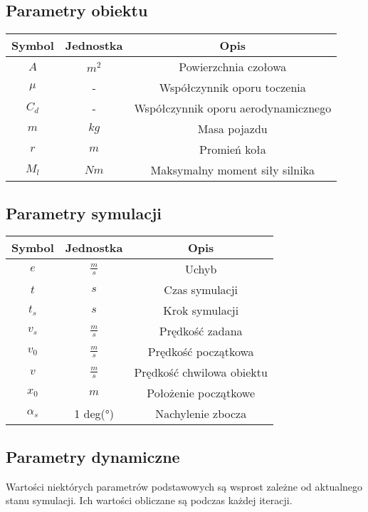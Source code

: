 \documentclass[12pt,a4paper]{article}
\begin{document}
	\subsection{Parametry obiektu}
	\begin{center}
		\begin{tabular}{|c|c|c|}
			\hline
			Symbol & Jednostka & Opis \\
			\hline
			\hline
			$A$ & $m^2$ & Powierzchnia czołowa \\
			\hline
			$\mu$ & - & Współczynnik oporu toczenia \\
			\hline
			$C_d$ & - & Współczynnik oporu aerodynamicznego \\
			\hline
			$m$ & $kg$ & Masa pojazdu \\
			\hline
			$r$ & $m$ & Promień koła \\
			\hline
			$M_l$ & $Nm$ & Maksymalny moment siły silnika \\
			\hline
		\end{tabular}
	\end{center}

	\subsection{Parametry symulacji}
	\begin{center}
		\begin{tabular}{|c|c|c|}
			\hline
			Symbol & Jednostka & Opis \\
			\hline
			\hline
			$e$ & $\frac{m}{s}$ & Uchyb \\
			\hline
			$t$ & $s$ & Czas symulacji \\
			\hline
			$t_s$ & $s$ & Krok symulacji \\
			\hline
			$v_s$ & $\frac{m}{s}$ & Prędkość zadana \\
			\hline
			$v_0$ & $\frac{m}{s}$ & Prędkość początkowa \\
			\hline
			$v$ & $\frac{m}{s}$ & Prędkość chwilowa obiektu \\
			\hline
			$x_0$ & $m$ & Położenie początkowe \\
			\hline
			$\alpha_s$ & 1 deg(°) & Nachylenie zbocza \\
			\hline
		\end{tabular}
	\end{center}
	
	\subsection{Parametry dynamiczne}
	Wartości niektórych parametrów podstawowych są wsprost zależne od aktualnego stanu symulacji. Ich wartości obliczane są podczas każdej iteracji.
	
\end{document}

